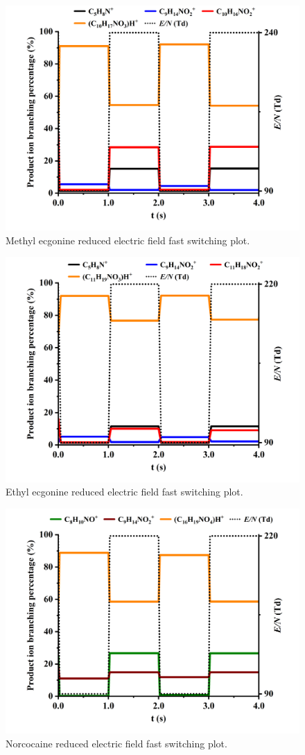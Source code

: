 \begin{figure}[htb]
\centering
\includegraphics[width=0.50\linewidth]{pics/other_drugs/MeEcg-fs-90-240.png}
\caption{Methyl ecgonine reduced electric field fast switching plot.}
\label{fig:DR_MeEcg_fs}
\end{figure}


\begin{figure}[htb]
\centering
\includegraphics[width=0.50\linewidth]{pics/other_drugs/EtEcg-fs-90-220.png}
\caption{Ethyl ecgonine reduced electric field fast switching plot.}
\label{fig:DR_EtEcg_fs}
\end{figure}


\begin{figure}[htb]
\centering
\includegraphics[width=0.50\linewidth]{pics/other_drugs/norcocaine-fs-90-220.png}
\caption{Norcocaine reduced electric field fast switching plot.}
\label{fig:DR_norcocaine_fs}
\end{figure}


